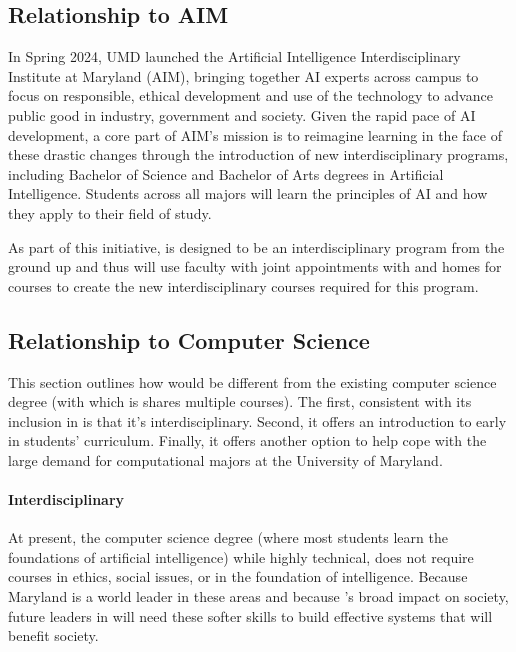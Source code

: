 
\subsection{Relationship to AIM}

In Spring 2024, UMD launched the Artificial Intelligence Interdisciplinary Institute at Maryland (AIM), bringing together AI experts across campus to focus on responsible, ethical development and use of the technology to advance public good in industry, government and society. Given the rapid pace of AI development, a core part of AIM’s mission is to reimagine learning in the face of these drastic changes through the introduction of new interdisciplinary programs, including Bachelor of Science and Bachelor of Arts degrees in Artificial Intelligence. Students across all majors will learn the principles of AI and how they apply to their field of study.

As part of this initiative, \short{} is designed to be an interdisciplinary program from the
ground up and thus will use faculty with joint appointments with
\aim{} and homes for courses to create the new interdisciplinary
courses required for this program.


\subsection{Relationship to Computer Science}

This section outlines how \short{} would be different from the existing computer science degree (with which is shares multiple courses).  The first, consistent with its inclusion in \aim{} is that it's interdisciplinary.  Second, it offers an introduction to  early in students' curriculum.  Finally, it offers another option to help cope with the large demand for computational majors at the University of Maryland.

\paragraph{Interdisciplinary}

At present, the computer science degree (where most students learn the foundations of artificial intelligence) while highly technical, does not require courses in ethics, social issues, or in the foundation of intelligence.
%
Because Maryland is a world leader in these areas and because 's broad impact on society, future leaders in  will need these softer skills to build effective systems that will benefit society.

